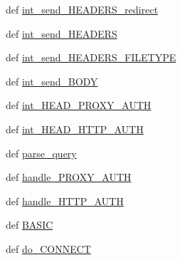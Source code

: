 \begin{DoxyCompactItemize}
def \hyperlink{class_proxy_1_1_proxy_acab4f744c21caa18f64a9825630fe7c1}{int\-\_\-send\-\_\-\-H\-E\-A\-D\-E\-R\-S\-\_\-redirect}
\item 
def \hyperlink{class_proxy_1_1_proxy_a29b4b46dc227817d96e5decebda2643d}{int\-\_\-send\-\_\-\-H\-E\-A\-D\-E\-R\-S}
\item 
def \hyperlink{class_proxy_1_1_proxy_aebddfde379db60d1ded977e657e6bec4}{int\-\_\-send\-\_\-\-H\-E\-A\-D\-E\-R\-S\-\_\-\-F\-I\-L\-E\-T\-Y\-P\-E}
\item 
def \hyperlink{class_proxy_1_1_proxy_ac7477499203679f01ba59c0763de4be8}{int\-\_\-send\-\_\-\-B\-O\-D\-Y}
\item 
def \hyperlink{class_proxy_1_1_proxy_a8d819c5915ae01dcaf8018098c6960e9}{int\-\_\-\-H\-E\-A\-D\-\_\-\-P\-R\-O\-X\-Y\-\_\-\-A\-U\-T\-H}
\item 
def \hyperlink{class_proxy_1_1_proxy_ae9c85135fb49817252b73425b119040a}{int\-\_\-\-H\-E\-A\-D\-\_\-\-H\-T\-T\-P\-\_\-\-A\-U\-T\-H}
\item 
def \hyperlink{class_proxy_1_1_proxy_a6d31d5befd7c4b94ee5175d4b0a6c8bb}{parse\-\_\-query}
\item 
def \hyperlink{class_proxy_1_1_proxy_a7a49414b02686c27d29bc911dccd66fd}{handle\-\_\-\-P\-R\-O\-X\-Y\-\_\-\-A\-U\-T\-H}
\item 
def \hyperlink{class_proxy_1_1_proxy_af666b8280db350ab1754a04f8561a4b9}{handle\-\_\-\-H\-T\-T\-P\-\_\-\-A\-U\-T\-H}
\item 
def \hyperlink{class_proxy_1_1_proxy_ad2d9d933fc7adfa8b17e1a5f0b175298}{B\-A\-S\-I\-C}
\item 
def \hyperlink{class_proxy_1_1_proxy_a742f2490a7a47accf1b409fb62547ee6}{do\-\_\-\-C\-O\-N\-N\-E\-C\-T}
\end{DoxyCompactItemize}
